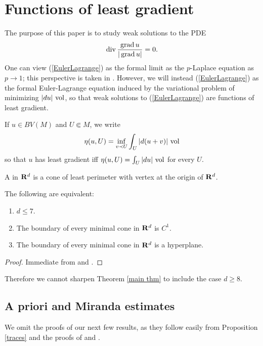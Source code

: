 \section{Functions of least gradient}\label{LeastGradientFunctions}
The purpose of this paper is to study weak solutions to the PDE
\begin{equation}\label{EulerLagrange}
\operatorname{div} \frac{\operatorname{grad} u}{|\operatorname{grad} u|} = 0.
\end{equation}
One can view (\ref{EulerLagrange}) as the formal limit as the $p$-Laplace equation as $p \to 1$; this perspective is taken in \cite[\S4]{daskalopoulos2020transverse}.
However, we will instead (\ref{EulerLagrange}) as the formal Euler-Lagrange equation induced by the variational problem of minimizing $|du|~\mathrm{vol}$, so that weak solutions to (\ref{EulerLagrange}) are functions of least gradient.

\begin{notation}
If $u \in BV(M)$ and $U \Subset M$, we write
$$\eta(u, U) = \inf_{v \prec U} \int_U |d(u+v)| ~\mathrm{vol}$$
so that $u$ has least gradient iff $\eta(u, U) = \int_U |du| ~\mathrm{vol}$ for every $U$.
\end{notation}

\begin{definition}
A  in $\mathbf{R}^d$ is a cone of least perimeter with vertex at the origin of $\mathbf{R}^d$.
\end{definition}

\begin{theorem}\label{minimal cones in R8}
The following are equivalent:
\begin{enumerate}
\item $d \leq 7$.
\item The boundary of every minimal cone in $\mathbf{R}^d$ is $C^1$.
\item The boundary of every minimal cone in $\mathbf{R}^d$ is a hyperplane.
\end{enumerate}
\end{theorem}
\begin{proof}
Immediate from \cite[Theorem 6.2.2]{Simons68} and \cite[Theorem A]{BOMBIERI1969}.
\end{proof}

Therefore we cannot sharpen Theorem \ref{main thm} to include the case $d \geq 8$.

\subsection{A priori and Miranda estimates}\label{MirandaStability}
We omit the proofs of our next few results, as they follow easily from Proposition \ref{traces} and the proofs of \cite[Teorema 2]{Miranda67} and \cite[Lemma 5.6, Remark 5.7]{Giusti77}.

